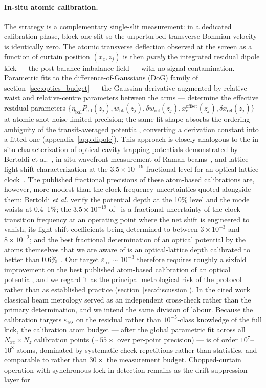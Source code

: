 \documentclass[11pt,a4paper]{article}
\begin{document}
\paragraph{In-situ atomic calibration.} The strategy is a complementary single-slit measurement: in a dedicated calibration phase, block one slit so the unperturbed transverse Bohmian velocity is identically zero. The atomic transverse deflection observed at the screen as a function of curtain position $(x_c, z_j)$ is then \emph{purely} the integrated residual dipole kick --- the post-balance imbalance field --- with no signal contamination. Parametric fits to the difference-of-Gaussians (DoG) family of section~\ref{sec:optics_budget} --- the Gaussian derivative augmented by relative-waist and relative-centre parameters between the arms --- determine the effective residual parameters $\{\eta_\text{bal}P_\text{eff}(z_j), w_\text{fit}(z_j), \delta w_\text{rel}(z_j), x_c^\text{offset}(z_j), \delta x_\text{rel}(z_j)\}$ at atomic-shot-noise-limited precision; the same fit shape absorbs the ordering ambiguity of the transit-averaged potential, converting a derivation constant into a fitted one (appendix~\ref{app:dipole}). This approach is closely analogous to the in situ characterization of optical-cavity trapping potentials demonstrated by Bertoldi et al.~\cite{Bertoldi2010}, in situ wavefront measurement of Raman beams~\cite{Xu2024}, and lattice light-shift characterization at the $3.5\times 10^{-19}$ fractional level for an optical lattice clock~\cite{Kim2023}. The published fractional precisions of these atom-based calibrations are, however, more modest than the clock-frequency uncertainties quoted alongside them: Bertoldi \emph{et al.} verify the potential depth at the 10\% level and the mode waists at 0.4--1\%; the $3.5\times 10^{-19}$ of~\cite{Kim2023} is a fractional uncertainty of the clock transition frequency at an operating point where the net shift is engineered to vanish, its light-shift coefficients being determined to between $3\times 10^{-3}$ and $8\times 10^{-2}$; and the best fractional determination of an optical potential by the atoms themselves that we are aware of is an optical-lattice depth calibrated to better than $0.6\%$~\cite{Zhou2018}. Our target $\varepsilon_\text{res} \sim 10^{-3}$ therefore requires roughly a sixfold improvement on the best published atom-based calibration of an optical potential, and we regard it as the principal metrological risk of the protocol rather than as established practice (section~\ref{sec:discussion}). In the cited work classical beam metrology served as an independent cross-check rather than the primary determination, and we intend the same division of labour. Because the calibration targets $\varepsilon_\text{res}$ on the residual rather than $10^{-5}$-class knowledge of the full kick, the calibration atom budget --- after the global parametric fit across all $N_{xc}\times N_z$ calibration points ($\sim 55\times$ over per-point precision) --- is of order $10^7$--$10^8$ atoms, dominated by systematic-check repetitions rather than statistics, and comparable to rather than $30\times$ the measurement budget. Chopped-curtain operation with synchronous lock-in detection remains as the drift-suppression layer for 
\end{document}
